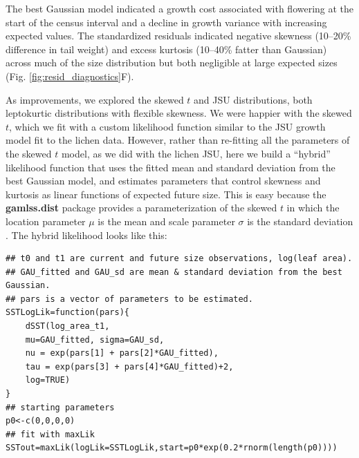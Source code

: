 \documentclass[12pt]{article}
\begin{document}
The best Gaussian model indicated a growth cost associated with flowering at the start of the census interval and a decline in growth variance with increasing expected values. 
The standardized residuals indicated negative skewness (10--20\% difference in tail weight) and excess kurtosis (10--40\% fatter than Gaussian) across much of the size distribution but both negligible at large expected sizes (Fig. \ref{fig:resid_diagnostics}F). 

As improvements, we explored the skewed $t$ and JSU distributions, both leptokurtic distributions with flexible skewness. 
We were happier with the skewed $t$, which we fit with a custom likelihood function similar to the JSU growth model fit to the lichen data. 
However, rather than re-fitting all the parameters of the skewed $t$ model, as we did with the lichen JSU, here we build a ``hybrid'' likelihood function that uses the fitted mean and standard deviation from the best Gaussian model, and estimates parameters that control skewness and kurtosis as linear functions of expected future size. 
This is easy because the \textbf{gamlss.dist} package provides a parameterization of the skewed $t$ in which the location parameter $\mu$ is the mean and scale parameter $\sigma$ is the standard deviation \citep{rigby2019distributions}. 
The hybrid likelihood looks like this:
\begin{lstlisting}
## t0 and t1 are current and future size observations, log(leaf area). 
## GAU_fitted and GAU_sd are mean & standard deviation from the best Gaussian.
## pars is a vector of parameters to be estimated.
SSTLogLik=function(pars){
	dSST(log_area_t1, 
	mu=GAU_fitted, sigma=GAU_sd,
	nu = exp(pars[1] + pars[2]*GAU_fitted),
	tau = exp(pars[3] + pars[4]*GAU_fitted)+2, 
	log=TRUE)
}
## starting parameters
p0<-c(0,0,0,0)
## fit with maxLik
SSTout=maxLik(logLik=SSTLogLik,start=p0*exp(0.2*rnorm(length(p0)))) 
\end{lstlisting}
\end{document}
